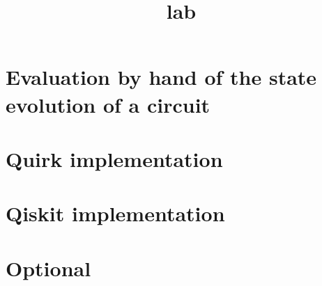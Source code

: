 \documentclass{article}
\title{lab}
\author{}
\date{}
\begin{document}
\maketitle

\section{Evaluation by hand of the state evolution of a circuit}



\section{Quirk implementation}



\section{Qiskit implementation}



\section{Optional}






\end{document}

